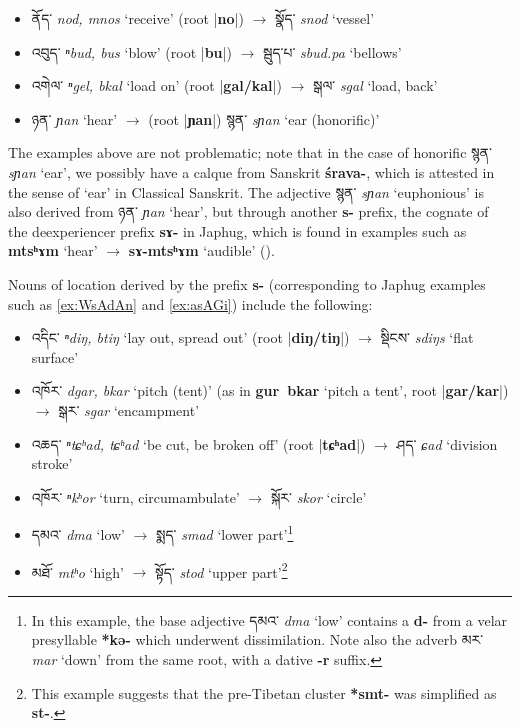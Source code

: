 \documentclass[oneside,a4paper,11pt]{article}
\newcommand{\ipa}[1]{\textbf{{\phon\mbox{#1}}}} %
\newcommand{\tibet}[3]{{\tibetain#1} \textit{\phon#2} `#3'}
\newcommand{\dhat}[1]{|\ipa{#1}|}
\begin{document}
\begin{itemize}
\item \tibet{ནོད་}{nod, mnos}{receive} (root \dhat{no}) $\rightarrow$	\tibet{སྣོད་}{snod}{vessel} 	
\item \tibet{འབུད་}{ⁿbud, bus}{blow} (root \dhat{bu}) $\rightarrow$	\tibet{སྦུད་པ་}{sbud.pa}{bellows} 
\item \tibet{འགེལ་}{ⁿgel, bkal}{load on} (root \dhat{gal/kal}) $\rightarrow$	\tibet{སྒལ་}{sgal}{load, back} 
\item \tibet{ཉན་}{ɲan}{hear} $\rightarrow$	(root \dhat{ɲan}) \tibet{སྙན་}{sɲan}{ear (honorific)} 
\end{itemize}

The examples above are not problematic; note that in the case of honorific \tibet{སྙན་}{sɲan}{ear}, we possibly have a calque from Sanskrit \ipa{śrava-}, which is attested in the sense of `ear' in Classical Sanskrit. The adjective \tibet{སྙན་}{sɲan}{euphonious} is also derived from \tibet{ཉན་}{ɲan}{hear}, but through another \ipa{s-} prefix, the cognate of the deexperiencer prefix \ipa{sɤ-} in Japhug, which is found in examples such as \ipa{mtsʰɤm} `hear' $\rightarrow$  \ipa{sɤ-mtsʰɤm} `audible' (\citealt{jacques12demotion}).

Nouns of location derived by the prefix \ipa{s-} (corresponding to Japhug examples such as \ref{ex:WsAdAn} and \ref{ex:asAGi}) include the following:

\begin{itemize}
\item \tibet{འདིང་}{ⁿdiŋ, btiŋ}{lay out, spread out} (root \dhat{diŋ/tiŋ}) $\rightarrow$	\tibet{སྡིངས་}{sdiŋs}{flat surface} 
\item \tibet{འཁོར་}{dgar, bkar}{pitch (tent)} (as in \ipa{gur bkar} `pitch a tent', root \dhat{gar/kar}) $\rightarrow$	\tibet{སྒར་}{sgar}{encampment} 
\item \tibet{འཆད་}{ⁿtɕʰad, tɕʰad}{be cut, be broken off} (root \dhat{tɕʰad}) $\rightarrow$	\tibet{ཤད་}{ɕad}{division stroke} 
\item \tibet{འཁོར་}{ⁿkʰor}{turn, circumambulate} $\rightarrow$	\tibet{སྐོར་}{skor}{circle} 
\item \tibet{དམའ་}{dma}{low} $\rightarrow$	\tibet{སྨད་}{smad}{lower part}\footnote{In this example, the base adjective \tibet{དམའ་}{dma}{low} contains a \ipa{d-} from a velar presyllable \ipa{*kə-} which underwent dissimilation. Note also the adverb \tibet{མར་}{mar}{down} from the same root, with a dative \ipa{-r} suffix. }
\item \tibet{མཐོ་}{mtʰo}{high} $\rightarrow$	\tibet{སྟོད་}{stod}{upper part}\footnote{This example suggests that the pre-Tibetan cluster \ipa{*smt-} was simplified as \ipa{st-}. }
\end{itemize}
 
\end{document}
